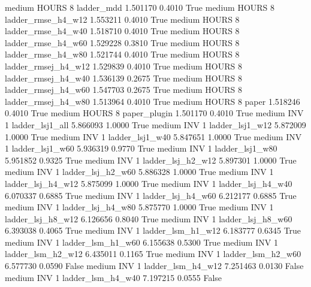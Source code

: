     medium    HOURS                 8          ladder_mdd   1.501170      0.4010    True
    medium    HOURS                 8  ladder_rmse_h4_w12   1.553211      0.4010    True
    medium    HOURS                 8  ladder_rmse_h4_w40   1.518710      0.4010    True
    medium    HOURS                 8  ladder_rmse_h4_w60   1.529228      0.3810    True
    medium    HOURS                 8  ladder_rmse_h4_w80   1.521744      0.4010    True
    medium    HOURS                 8 ladder_rmsej_h4_w12   1.529839      0.4010    True
    medium    HOURS                 8 ladder_rmsej_h4_w40   1.536139      0.2675    True
    medium    HOURS                 8 ladder_rmsej_h4_w60   1.547703      0.2675    True
    medium    HOURS                 8 ladder_rmsej_h4_w80   1.513964      0.4010    True
    medium    HOURS                 8               paper   1.518246      0.4010    True
    medium    HOURS                 8        paper_plugin   1.501170      0.4010    True
    medium      INV                 1     ladder_lsj1_all   5.866093      1.0000    True
    medium      INV                 1     ladder_lsj1_w12   5.872009      1.0000    True
    medium      INV                 1     ladder_lsj1_w40   5.847651      1.0000    True
    medium      INV                 1     ladder_lsj1_w60   5.936319      0.9770    True
    medium      INV                 1     ladder_lsj1_w80   5.951852      0.9325    True
    medium      INV                 1   ladder_lsj_h2_w12   5.897301      1.0000    True
    medium      INV                 1   ladder_lsj_h2_w60   5.886328      1.0000    True
    medium      INV                 1   ladder_lsj_h4_w12   5.875099      1.0000    True
    medium      INV                 1   ladder_lsj_h4_w40   6.070337      0.6885    True
    medium      INV                 1   ladder_lsj_h4_w60   6.212177      0.6885    True
    medium      INV                 1   ladder_lsj_h4_w80   5.875770      1.0000    True
    medium      INV                 1   ladder_lsj_h8_w12   6.126656      0.8040    True
    medium      INV                 1   ladder_lsj_h8_w60   6.393038      0.4065    True
    medium      INV                 1   ladder_lsm_h1_w12   6.183777      0.6345    True
    medium      INV                 1   ladder_lsm_h1_w60   6.155638      0.5300    True
    medium      INV                 1   ladder_lsm_h2_w12   6.435011      0.1165    True
    medium      INV                 1   ladder_lsm_h2_w60   6.577730      0.0590   False
    medium      INV                 1   ladder_lsm_h4_w12   7.251463      0.0130   False
    medium      INV                 1   ladder_lsm_h4_w40   7.197215      0.0555   False
